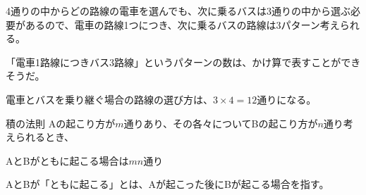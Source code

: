 \documentclass[../../../topic_statistics]{subfiles}
\begin{document}
4通りの中からどの路線の電車を選んでも、次に乗るバスは3通りの中から選ぶ必要があるので、電車の路線1つにつき、次に乗るバスの路線は3パターン考えられる。

\br

「電車1路線につきバス3路線」というパターンの数は、かけ算で表すことができそうだ。

電車とバスを乗り継ぐ場合の路線の選び方は、$3 \times 4 = 12$通りになる。

\begin{theorem}{積の法則}\label{thm:rule-of-product}
  Aの起こり方が$m$通りあり、その各々についてBの起こり方が$n$通り考えられるとき、
  \begin{center}
    AとBがともに起こる場合は$mn$通り
  \end{center}
\end{theorem}

AとBが「ともに起こる」とは、Aが起こった後にBが起こる場合を指す。

\br
\end{document}
